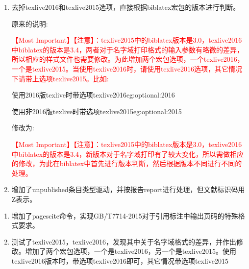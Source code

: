 \begin{enumerate}
\item 去掉texlive2016和texlive2015选项，直接根据biblatex宏包的版本进行判断。

原来的说明:
\begin{texlist}
    \textcolor{red}{\HandRight \heiti 【Most Important】【注意】：texlive2015中的biblatex版本是3.0，texlive2016中biblatex的版本是3.4，两者对于名字域打印格式的输入参数有略微的差异，所以相应的样式文件也需要修改。为此增加两个宏包选项，一个texlive2016，一个是texlive2015。当使用texlive2016时，请使用texlive2016选项，其它情况下请带上选项texlive2015。比如:}

    \begin{codetex}{使用2016版texlive时带选项texlive2016}{eg:optional:2016}
    \usepackage[backend=biber,texlive2016,style=gb7714-2015]{biblatex}
    \end{codetex}

    \begin{codetex}{使用非2016版texlive时带选项texlive2015}{eg:optional:2015}
    \usepackage[backend=biber,texlive2015,style=gb7714-2015]{biblatex}
    \end{codetex}
\end{texlist}

修改为:
\begin{texlist}
    \textcolor{red}{\HandRight \heiti 【Most Important】【注意】：texlive2015中的biblatex版本是3.0，texlive2016中biblatex的版本是3.4，新版本对于名字域打印有了较大变化，所以需做相应的修改，为此在biblatex中首先进行版本判断，然后根据版本不同进行不同的处理。}
\end{texlist}

\item 增加了unpublished条目类型驱动，并按报告report进行处理，但文献标识码用Z表示。
\end{enumerate}

\begin{enumerate}
\item 增加了pagescite命令，实现GB/T7714-2015对于引用标注中输出页码的特殊格式要求。

\item 测试了texlive2015，texlive2016，发现其中关于名字域格式的差异，并作出修改。增加了两个宏包选项，一个是texlive2016，另一个是texlive2015。使用texlive2016版本时，带选项texlive2016即可，其它情况带选项texlive2015
\end{enumerate}


